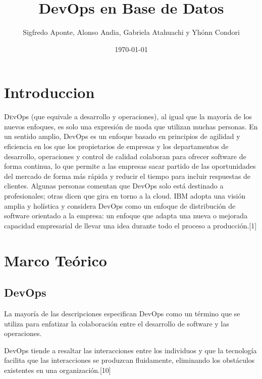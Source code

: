 \documentclass[twoside,twocolumn]{article}
\title{DevOps en Base de Datos} %
\author{Sigfredo Aponte, Alonso Andia, Gabriela Atahuachi y Yhónn Condori}
\date{\today} %
\begin{document}
\maketitle
\section{Introduccion}
\lettrine[nindent=0em,lines=3]{D}evOps (que equivale a desarrollo y operaciones), al igual que la mayoría de los nuevos enfoques, es solo una expresión de moda que utilizan muchas personas. En un sentido amplio, DevOps es un enfoque basado en principios de agilidad y eficiencia en los que los propietarios de empresas y los departamentos de desarrollo, operaciones y control de calidad colaboran para ofrecer software de forma continua, lo que permite a las empresas sacar partido de las oportunidades del mercado de forma más rápida y reducir el tiempo para incluir respuestas de clientes.
Algunas personas comentan que DevOps solo está destinado a profesionales; otras dicen que gira en torno a la cloud. IBM adopta una visión amplia y holística y considera DevOps como un enfoque de distribución de software orientado a la empresa: un enfoque que adapta una nueva o mejorada capacidad empresarial de llevar una idea durante todo el proceso a producción.[1] 




\section{Marco Teórico}

\subsection{DevOps}

La mayoría de las descripciones especifican DevOps como un término que se utiliza para enfatizar la colaboración entre el desarrollo de software y las operaciones.

DevOps tiende a resaltar las interacciones entre los individuos y que la tecnología facilita que las interacciones se produzcan fluidamente, eliminando los obstáculos existentes en una organización.[10]
\end{document}
